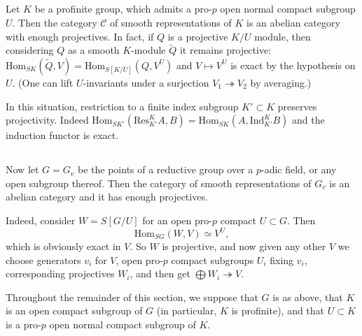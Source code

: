 \documentclass[10pt]{amsart}
\newcommand{\changecolor}{black}
\newcommand{\Hom}{\mathrm{Hom}}
\theoremstyle{remark}
\begin{document}
%
\subsection{} \label{Udefsec}
Let $K$ be a profinite group, which admits a pro-$p$ open normal compact subgroup $U$. 
Then the category $\mathcal{C}$ of smooth representations of $K$ 
 is   an abelian category with enough projectives.  
 In fact, 
 if $Q$ is a projective $K/U$ module, then considering $Q$
 as a smooth $K$-module $\tilde{Q}$ it remains projective: 
 $\Hom_{SK}(\tilde{Q}, V) = \Hom_{S[K/U]}(Q, V^U)$ and $V \mapsto V^U$ is exact by the hypothesis on $U$. 
 (One can lift $U$-invariants under a surjection $V_1 \twoheadrightarrow V_2$ by averaging.) 
%
%
%
%
%



In this situation, restriction to a finite index subgroup $K' \subset K$ preserves projectivity.  
Indeed $\Hom_{SK'}(\mathrm{Res}^{K}_{K'} A, B) = \Hom_{SK}(A, \mathrm{Ind}_{K'}^K B)$
and the induction functor is exact. 



\subsection{} \label{enough_proj}
Now let $G=G_v$ be the points of a reductive group over a $p$-adic field, or any open subgroup thereof. Then 
 the category of  smooth representations of $G_v$ is an abelian category and it has enough projectives. 
 

Indeed,
consider $W = S[G/U]$ for an open pro-$p$ compact $U \subset G$.
Then $$\Hom_{SG}(W, V) \simeq V^{U},$$ which is obviously exact in $V$. 
   So $W$ is projective, and now given any other $V$
we choose generators $v_i$ for $V$, open pro-$p$ compact subgroups $U_i$ fixing $v_i$,  corresponding projectives
$W_i$, and then get $\bigoplus W_i \twoheadrightarrow V$. 


 Throughout the remainder of this section, we suppose that $G$ is  as above,
that  $K$ is an open compact subgroup of $G$ (in particular, $K$ is profinite),
and that $U \subset K$ is a pro-$p$ open {\color{\changecolor} normal} compact subgroup of $K$.  

  



\subsection{} \label{Qdef}  
 
\end{document}
